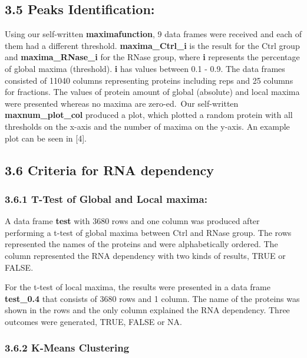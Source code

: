 \documentclass[
]{article}
\begin{document}
\hypertarget{peaks-identification-1}{%
\subsection{3.5 Peaks Identification:}\label{peaks-identification-1}}

Using our self-written \textbf{maximafunction}, 9 data frames were
received and each of them had a different threshold.
\textbf{maxima\_Ctrl\_i} is the result for the Ctrl group and
\textbf{maxima\_RNase\_i} for the RNase group, where \textbf{i}
represents the percentage of global maxima (threshold). \textbf{i} has
values between 0.1 - 0.9. The data frames consisted of 11040 columns
representing proteins including reps and 25 columns for fractions. The
values of protein amount of global (absolute) and local maxima were
presented whereas no maxima are zero-ed.~Our self-written
\textbf{maxnum\_plot\_col} produced a plot, which plotted a random
protein with all thresholds on the x-axis and the number of maxima on
the y-axis. An example plot can be seen in {[}4{]}.

\hypertarget{criteria-for-rna-dependency-1}{%
\subsection{3.6 Criteria for RNA
dependency}\label{criteria-for-rna-dependency-1}}

\hypertarget{t-test-of-global-and-local-maxima}{%
\subsubsection{3.6.1 T-Test of Global and Local
maxima:}\label{t-test-of-global-and-local-maxima}}

A data frame \textbf{test} with 3680 rows and one column was produced
after performing a t-test of global maxima between Ctrl and RNase group.
The rows represented the names of the proteins and were alphabetically
ordered. The column represented the RNA dependency with two kinds of
results, TRUE or FALSE.

For the t-test of local maxima, the results were presented in a data
frame \textbf{test\_0.4} that consists of 3680 rows and 1 column. The
name of the proteins was shown in the rows and the only column explained
the RNA dependency. Three outcomes were generated, TRUE, FALSE or NA.

\hypertarget{k-means-clustering}{%
\subsubsection{3.6.2 K-Means Clustering}\label{k-means-clustering}}
\end{document}

